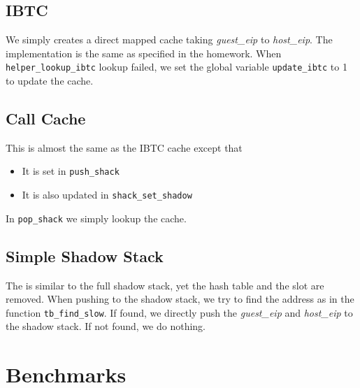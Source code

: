 \documentclass{article}
\begin{document}
\subsection{IBTC}
We simply creates a direct mapped cache taking \textit{guest\_eip} to \textit{host\_eip}. The implementation is the same as specified in the homework. When \texttt{helper\_lookup\_ibtc} lookup failed, we set the global variable \texttt{update\_ibtc} to 1 to update the cache.
\subsection{Call Cache}
This is almost the same as the IBTC cache except that
\begin{itemize}
\item It is set in \texttt{push\_shack}
\item It is also updated in \texttt{shack\_set\_shadow}
\end{itemize}
In \texttt{pop\_shack} we simply lookup the cache.
\subsection{Simple Shadow Stack}
The is similar to the full shadow stack, yet the hash table and the slot are removed. When pushing to the shadow stack, we try to find the address as in the function \texttt{tb\_find\_slow}. If found, we directly push the \textit{guest\_eip} and \textit{host\_eip} to the shadow stack. If not found, we do nothing.
\section{Benchmarks}
\end{document}
